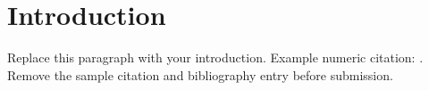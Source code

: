 \chapter{Introduction}

Replace this paragraph with your introduction. Example numeric citation: \parencite{sample2026}. Remove the sample citation and bibliography entry before submission.
